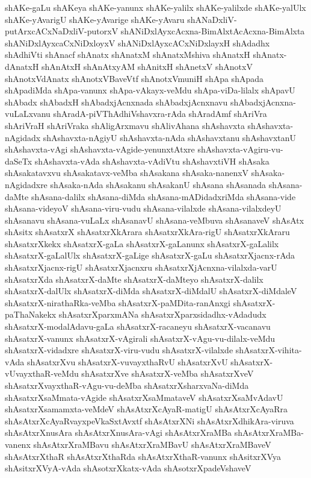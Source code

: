 {shAKe-gaLu
shAKeya
shAKe-yanunx
shAKe-yalilx
shAKe-yalilxde
shAKe-yalUlx
shAKe-yAvarigU
shAKe-yAvarige
shAKe-yAvaru
shANaDxliV-putArxcACxNaDxliV-putorxV
shANiDxlAyxcAcxna-BimAlxtAcAcxna-BimAlxta
shANiDxlAyxcaCxNiDxloyxV
shANiDxlAyxcACxNiDxlayxH
shAdadhx
shAdhiVti
shAnacf
shAnatx
shAnatxM
shAnatxMshiva
shAnatxH
shAnatx-dAnatxH
shAnAtxH
shAnAtxyAM
shAnitxH
shAnetxV
shAnotxV
shAnotxVdAnatx
shAnotxVBaveVtf
shAnotxVmuniH
shApa
shApada
shApadiMda
shApa-vanunx
shApa-vAkayx-veMdu
shApa-viDa-lilalx
shApavU
shAbadx
shAbadxH
shAbadxjAcnxnada
shAbadxjAcnxnavu
shAbadxjAcnxna-vuLaLxvanu
shAradA-piVThAdhiVshavxra-rAda
shAradAmf
shAriVra
shAriVraH
shAriVraka
shAligArxmavu
shAlivAhana
shAshavxta
shAshavxta-nAgidadx
shAshavxta-nAgiyU
shAshavxta-nAda
shAshavxtanu
shAshavxtanU
shAshavxta-vAgi
shAshavxta-vAgide-yenunxtAtxre
shAshavxta-vAgiru-vu-daSeTx
shAshavxta-vAda
shAshavxta-vAdiVtu
shAshavxtiVH
shAsaka
shAsakatavxvu
shAsakatavx-veMba
shAsakana
shAsaka-nanenxV
shAsaka-nAgidadxre
shAsaka-nAda
shAsakanu
shAsakanU
shAsana
shAsanada
shAsana-daMte
shAsana-dalilx
shAsana-diMda
shAsana-mADidadxriMda
shAsana-vide
shAsana-videyoV
shAsana-viru-vudu
shAsana-vilalxde
shAsana-vilalxdeyU
shAsanavu
shAsana-vuLaLx
shAsanavU
shAsana-veMbuva
shAsanaveV
shAsAtx
shAsitx
shAsatxrX
shAsatxrXkArara
shAsatxrXkAra-rigU
shAsatxrXkAraru
shAsatxrXkekx
shAsatxrX-gaLa
shAsatxrX-gaLanunx
shAsatxrX-gaLalilx
shAsatxrX-gaLalUlx
shAsatxrX-gaLige
shAsatxrX-gaLu
shAsatxrXjacnx-rAda
shAsatxrXjacnx-rigU
shAsatxrXjacnxru
shAsatxrXjAcnxna-vilalxda-varU
shAsatxrXda
shAsatxrX-daMte
shAsatxrX-daMteyo
shAsatxrX-dalilx
shAsatxrX-dalUlx
shAsatxrX-diMda
shAsatxrX-diMdalU
shAsatxrX-diMdaleV
shAsatxrX-nirathaRka-veMba
shAsatxrX-paMDita-ranAnxgi
shAsatxrX-paThaNakekx
shAsatxrXparxmANa
shAsatxrXparxsidadhx-vAdadudx
shAsatxrX-modalAdavu-gaLa
shAsatxrX-racaneyu
shAsatxrX-vacanavu
shAsatxrX-vanunx
shAsatxrX-vAgirali
shAsatxrX-vAgu-vu-dilalx-veMdu
shAsatxrX-vidadxre
shAsatxrX-viru-vudu
shAsatxrX-vilalxde
shAsatxrX-vihita-vAda
shAsatxrXvu
shAsatxrX-vuvayxthaRvU
shAsatxrXvU
shAsatxrX-vUvayxthaR-veMdu
shAsatxrXve
shAsatxrX-veMba
shAsatxrXveV
shAsatxrXvayxthaR-vAgu-vu-deMba
shAsatxrXsharxvaNa-diMda
shAsatxrXsaMmata-vAgide
shAsatxrXsaMmataveV
shAsatxrXsaMvAdavU
shAsatxrXsamamxta-veMdeV
shAsAtxrXcAyaR-matigU
shAsAtxrXcAyaRra
shAsAtxrXcAyaRvayxpeVkaSxtAvxtf
shAsAtxrXNi
shAsAtxrXdhikAra-viruva
shAsAtxrXnusAra
shAsAtxrXnusAra-vAgi
shAsAtxrXraMBa
shAsAtxrXraMBa-vanenx
shAsAtxrXraMBavu
shAsAtxrXraMBavU
shAsAtxrXraMBaveV
shAsAtxrXthaR
shAsAtxrXthaRda
shAsAtxrXthaR-vanunx
shAsitxrXVya
shAsitxrXVyA-vAda
shAsotxrXkatx-vAda
shAsotxrXpadeVshaveV
}
